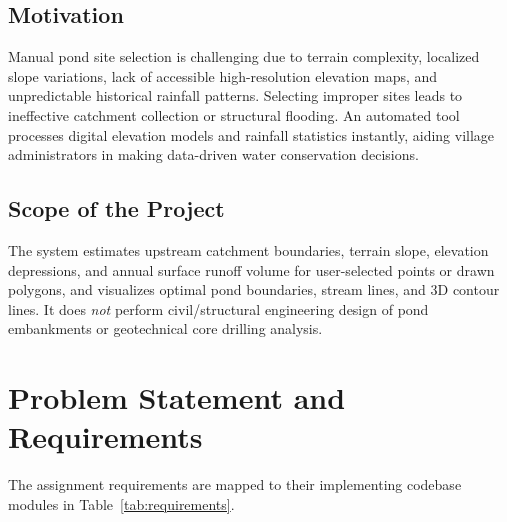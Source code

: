 \documentclass[manuscript,screen,review]{acmart}
\begin{document}
\subsection{Motivation}
Manual pond site selection is challenging due to terrain complexity, localized slope variations, lack of accessible high-resolution elevation maps, and unpredictable historical rainfall patterns. Selecting improper sites leads to ineffective catchment collection or structural flooding. An automated tool processes digital elevation models and rainfall statistics instantly, aiding village administrators in making data-driven water conservation decisions.

\subsection{Scope of the Project}
The system estimates upstream catchment boundaries, terrain slope, elevation depressions, and annual surface runoff volume for user-selected points or drawn polygons, and visualizes optimal pond boundaries, stream lines, and 3D contour lines. It does \emph{not} perform civil/structural engineering design of pond embankments or geotechnical core drilling analysis.

\section{Problem Statement and Requirements}
\label{sec:requirements}
The assignment requirements are mapped to their implementing codebase modules in Table~\ref{tab:requirements}.
\end{document}
